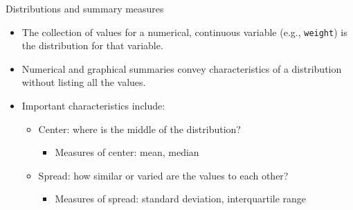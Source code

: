 \documentclass[10pt]{beamer}\usepackage[]{graphicx}\usepackage[]{color}
\makeatletter
\newcommand{\hlopt}[1]{\textcolor[rgb]{0,0,0}{#1}}%
\newcommand{\hlstd}[1]{\textcolor[rgb]{0.345,0.345,0.345}{#1}}%
\newcommand{\hlkwd}[1]{\textcolor[rgb]{0.737,0.353,0.396}{\textbf{#1}}}%
\newenvironment{kframe}{%
 \def\at@end@of@kframe{}%
 \ifinner\ifhmode%
  \def\at@end@of@kframe{\end{minipage}}%
  \begin{minipage}{\columnwidth}%
 \fi\fi%
 \def\FrameCommand##1{\hskip\@totalleftmargin \hskip-\fboxsep
 \colorbox{shadecolor}{##1}\hskip-\fboxsep
     \hskip-\linewidth \hskip-\@totalleftmargin \hskip\columnwidth}%
 \MakeFramed {\advance\hsize-\width
   \@totalleftmargin\z@ \linewidth\hsize
   \@setminipage}}%
 {\par\unskip\endMakeFramed%
 \at@end@of@kframe}
\newenvironment{knitrout}{}{} %
\makeatother
\begin{document}
\begin{frame}{Distributions and summary measures}
	\protect\hypertarget{distributions-and-summary-measures}{}

\begin{itemize}
	\item  The collection of values for a numerical, continuous variable (e.g.,
	\texttt{weight}) is the \alert{distribution} for that variable.
	
	\pause 
	
\item 	Numerical and graphical summaries convey characteristics of a
	distribution without listing all the values.
	
\item Important characteristics include:
	
	\begin{itemize}
		\tightlist
		\item
		Center: where is the middle of the distribution?
		
		\begin{itemize}
			\tightlist
			\item
			Measures of center: mean, median
		\end{itemize}
	\pause 
	
		\item
		Spread: how similar or varied are the values to each other?
		
		\begin{itemize}
			\tightlist
			\item
			Measures of spread: standard deviation, interquartile range
		\end{itemize}
	\end{itemize}

\end{itemize}
	
\end{frame}



\end{document}
